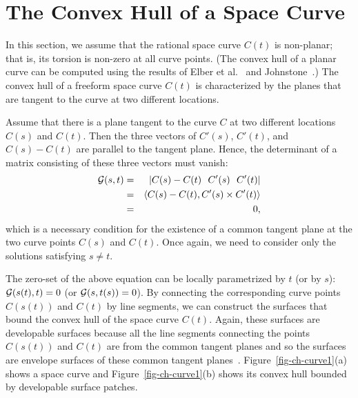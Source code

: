 \documentclass{elsart}
\begin{document}
\section{The Convex Hull of a Space Curve}
\label{sec-space-curve}

In this section, we assume that the rational space curve $C(t)$ is
non-planar; that is, its torsion is non-zero at all curve points.
(The convex hull of a planar curve can be computed using the results
of Elber et al.~\cite{Elber2001b} and Johnstone~\cite{Johnstone2001}.)
The convex hull of a freeform space curve $C(t)$ is characterized
by the planes that are tangent to the curve at two different locations.

Assume that there is a plane tangent to the curve $C$ at two different
locations $C(s)$ and $C(t)$.  Then the three vectors of
$C'(s)$, $C'(t)$, and $C(s)-C(t)$ are parallel to the tangent plane.
Hence, the determinant of a matrix consisting of these three vectors 
must vanish:
\begin{eqnarray*}
{\cal G}(s,t) &=& |C(s)-C(t)\ \ C'(s)\ \ C'(t)|\\
&=& \inner{C(s)-C(t)}{C'(s) \times C'(t)}\\
&=& 0,
\end{eqnarray*}
which is a necessary condition for the existence of
a common tangent plane at the two curve points $C(s)$ and $C(t)$.
Once again, we need to consider only the solutions satisfying $s \neq t$.

The zero-set of the above equation can be locally parametrized 
by $t$ (or by $s$): ${\cal G}(s(t),t) = 0$
(or ${\cal G}(s,t(s)) = 0$).
By connecting the corresponding curve points $C(s(t))$ and $C(t)$
by line segments, we can construct the surfaces
that bound the convex hull of the space curve $C(t)$. Again, these
surfaces are developable surfaces because all the line segments 
connecting the points $C(s(t))$ and $C(t)$ are from the common 
tangent planes and so the surfaces are envelope surfaces of these
common tangent planes~\cite{Pottmann}.
Figure~\ref{fig-ch-curve1}(a) shows a space curve and
Figure~\ref{fig-ch-curve1}(b) shows its convex hull bounded by
developable surface patches.
\end{document}
